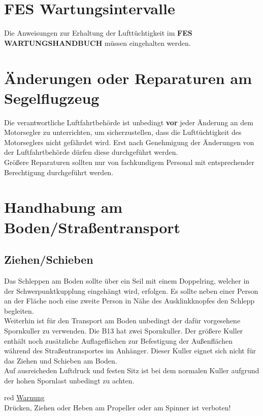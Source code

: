 \section{FES Wartungsintervalle}

Die Anweisungen zur Erhaltung der Lufttüchtigkeit im \textbf{FES WARTUNGSHANDBUCH} müssen eingehalten werden.

\section{Änderungen oder Reparaturen am Segelflugzeug}
Die verantwortliche Luftfahrtbehörde ist unbedingt \textbf{vor} jeder Änderung an dem Motorsegler zu unterrichten, um sicherzustellen, dass die Lufttüchtigkeit des Motorseglers nicht gefährdet wird. Erst nach Genehmigung der Änderungen von der Luftfahrtbehörde dürfen diese durchgeführt werden. \\
\newline
Größere Reparaturen sollten nur von fachkundigem Personal mit entsprechender Berechtigung durchgeführt werden. 
\newpage
\section{Handhabung am Boden/Straßentransport}

\subsection{Ziehen/Schieben}
Das Schleppen am Boden sollte über ein Seil mit einem Doppelring, welcher in der Schwerpunktkupplung eingehängt wird, erfolgen. Es sollte neben einer Person an der Fläche noch eine zweite Person in Nähe des Ausklinkknopfes den Schlepp begleiten. \\
\newline
Weiterhin ist für den Transport am Boden unbedingt der dafür vorgesehene Spornkuller zu verwenden. Die B13 hat zwei Spornkuller. Der größere Kuller enthält noch zusätzliche Auflageflächen zur Befestigung der Außenflächen während des Straßentransportes im Anhänger. Dieser Kuller eignet sich nicht für das Ziehen und Schieben am Boden. \\
Auf ausreicheden Luftdruck und festen Sitz ist bei dem normalen Kuller aufgrund der hohen Spornlast unbedingt zu achten.\\
\newline

\begin{color}{red}
\large{\underline{Warnung}}\\
Drücken, Ziehen oder Heben am Propeller oder am Spinner ist verboten!
\end{color}\\

